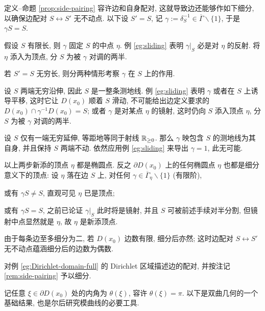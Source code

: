 \begin{remark}\label{rem:side-pairing}
	定义--命题 \ref{prop:side-pairing} 容许边和自身配对, 这就导致边还能够作如下细分, 以确保边配对 $S \leftrightarrow S'$ 无不动点. 以下设 $S' = S$, 记 $\gamma := \delta_S^{-1} \in \overline{\Gamma} \smallsetminus \{1\}$, 于是 $\gamma S = S$.
	\begin{compactenum}
		\item 假设 $S$ 有限长, 则 $\gamma$ 固定 $S$ 的中点 $\eta$. 例 \ref{eg:sliding} 表明 $\gamma|_S$ 必是对 $\eta$ 的反射. 将 $\eta$ 添入为顶点, 分 $S$ 为被 $\gamma$ 对调的两半.
		\item 若 $S' = S$ 无穷长, 则分两种情形考察 $\gamma$ 在 $S$ 上的作用.
		\begin{compactitem}
			\item 设 $S$ 两端无穷沿伸, 因此 $S$ 是一整条测地线. 例 \ref{eg:sliding} 表明 $\gamma$ 或者在 $S$ 上诱导平移, 这时它让 $D(x_0)$ 顺着 $S$ 滑动, 不可能给出边定义要求的 $D(x_0) \cap \gamma^{-1}D(x_0) = S$; 或者 $\gamma$ 是对某点 $\eta$ 的镜射, 这时仍向 $S$ 添入顶点 $\eta$, 分 $S$ 为被 $\gamma$ 对调的两半.
			\item 设 $S$ 仅有一端无穷延伸, 等距地等同于射线 $\mathbb{R}_{\geq 0}$. 那么 $\gamma$ 映包含 $S$ 的测地线为其自身, 并且保持 $S$ 两端不动. 依然应用例 \ref{eg:sliding} 来导出 $\gamma = 1$, 此无可能.
		\end{compactitem}
	\end{compactenum}

	以上两步新添的顶点 $\eta$ 都是椭圆点. 反之 $\partial D(x_0)$ 上的任何椭圆点 $\eta$ 也都是细分意义下的顶点: 设 $\eta$ 落在边 $S$ 上, 对任何 $\gamma \in \overline{\Gamma}_\eta \smallsetminus \{1\}$ (有限阶),
	\begin{compactitem}
		\item 或有 $\gamma S \neq S$, 直观可见 $\eta$ 已是顶点;
		\item 或有 $\gamma S = S$, 之前已论证 $\gamma|_S$ 此时将是镜射, 并且 $S$ 可被前述手续对半分割, 但镜射中点显然就是 $\eta$, 故 $\eta$ 是新添顶点.
	\end{compactitem}
	由于每条边至多细分为二, 若 $D(x_0)$ 边数有限, 细分后亦然; 这时边配对 $S \leftrightarrow S'$ 无不动点蕴涵细分后的边数为偶数.
\end{remark}

\begin{exercise}
	对例 \ref{eg:Dirichlet-domain-full} 的 Dirichlet 区域描述边的配对, 并按注记 \ref{rem:side-pairing} 予以细分.
\end{exercise}

记任意 $\xi \in \partial D(x_0)$ 处的内角为 $\theta(\xi)$, 容许 $\theta(\xi) = \pi$. 以下是双曲几何的一个基础结果, 也是尔后研究模曲线的必要工具.

